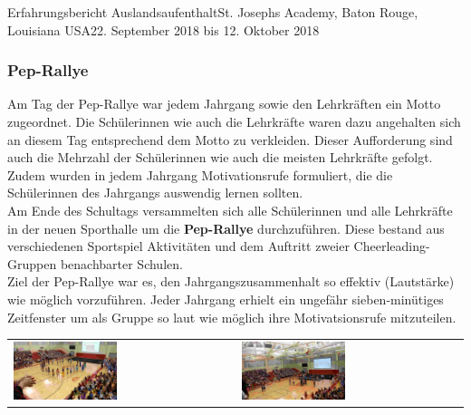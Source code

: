 \documentclass[oneside,openany,headings=optiontotoc,11pt,numbers=noenddot]{article}
\begin{document}
\begin{worksheet}{Erfahrungsbericht Auslandsaufenthalt}{St. Joseph\grq{}s Academy, Baton Rouge, Louisiana USA}{22. September 2018 bis 12. Oktober 2018}
		\subsubsection*{Pep-Rallye}
		Am Tag der Pep-Rallye war jedem Jahrgang sowie den Lehrkräften ein Motto zugeordnet. Die Schülerinnen wie auch die Lehrkräfte waren dazu angehalten sich an diesem Tag entsprechend dem Motto zu verkleiden. Dieser Aufforderung sind auch die Mehrzahl der Schülerinnen wie auch die meisten Lehrkräfte gefolgt.\\
		Zudem wurden in jedem Jahrgang \grq{}Motivationsrufe\grq{} formuliert, die die Schülerinnen des Jahrgangs auswendig lernen sollten.\\
		Am Ende des Schultags versammelten sich alle Schülerinnen und alle Lehrkräfte in der neuen Sporthalle um die \textbf{Pep-Rallye} durchzuführen. Diese bestand aus verschiedenen Sportspiel Aktivitäten und dem Auftritt zweier Cheerleading-Gruppen benachbarter Schulen.\\
		Ziel der Pep-Rallye war es, den Jahrgangszusammenhalt so effektiv (Lautstärke) wie möglich vorzuführen. Jeder Jahrgang erhielt ein ungefähr sieben-minütiges Zeitfenster um als Gruppe so laut wie möglich ihre \grq{}Motivatsionsrufe\grq{} mitzuteilen.\\
		\par\noindent
		\begin{center}
			\begin{tabularx}{\textwidth}{XX}
				\includegraphics[width=0.48\textwidth]{../99_Bilder/00_pepralley.jpg} & \includegraphics[width=0.48\textwidth]{../99_Bilder/01_pepralley.jpg}
			\end{tabularx}\\
		\end{center}
		\par\noindent

\end{worksheet}
\end{document}
